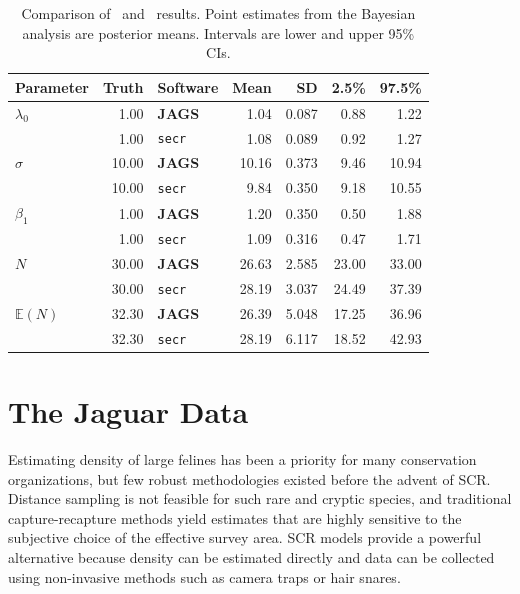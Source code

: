 \begin{table}%
\centering
\caption{Comparison of \secr~and \jags~results. Point estimates from
  the Bayesian analysis are posterior means. Intervals are lower and
  upper 95\% CIs.}
\begin{tabular}{lrlrrrr}
\hline
Parameter 	& Truth 	& Software 	& Mean 	& SD 	& 2.5\% & 97.5\% \\
\hline
 $\lambda_0$ 	&  1.00 	& \textbf{JAGS} 	&  1.04 	& 0.087 	&  0.88 	&  1.22 \\
                &  1.00 	& \texttt{secr} 	&  1.08 	& 0.089 	&  0.92 	&  1.27 \\
 $\sigma$ 	& 10.00 	& \textbf{JAGS} 	& 10.16 	& 0.373 	&  9.46 	& 10.94 \\
  	        & 10.00 	& \texttt{secr} 	&  9.84 	& 0.350 	&  9.18 	& 10.55 \\
 $\beta_1$ 	&  1.00 	& \textbf{JAGS} 	&  1.20 	& 0.350 	&  0.50 	&  1.88 \\
  	        &  1.00 	& \texttt{secr} 	&  1.09 	& 0.316 	&  0.47 	&  1.71 \\
 $N$ 	        & 30.00 	& \textbf{JAGS} 	& 26.63 	& 2.585 	& 23.00 	& 33.00 \\
  	        & 30.00 	& \texttt{secr} 	& 28.19 	& 3.037 	& 24.49 	& 37.39 \\
 $\mathbb{E}(N)$ 	& 32.30 	& \textbf{JAGS} 	& 26.39 	& 5.048 	& 17.25 	& 36.96 \\
  	        & 32.30 	& \texttt{secr} 	& 28.19 	& 6.117 	& 18.52 	& 42.93 \\
\hline
\end{tabular}
\label{state-space.tab.jagsVsecr}
\end{table}




\section{The Jaguar Data}

Estimating density of large felines has been a priority for many
conservation organizations, but few robust methodologies existed before
the advent of SCR. Distance sampling is not feasible for such rare and
cryptic species, and traditional capture-recapture methods yield
estimates that are highly sensitive to the subjective choice of the
effective survey area. SCR models provide a powerful alternative
because density can be estimated directly and data can be collected
using non-invasive methods such as camera traps or hair snares.

